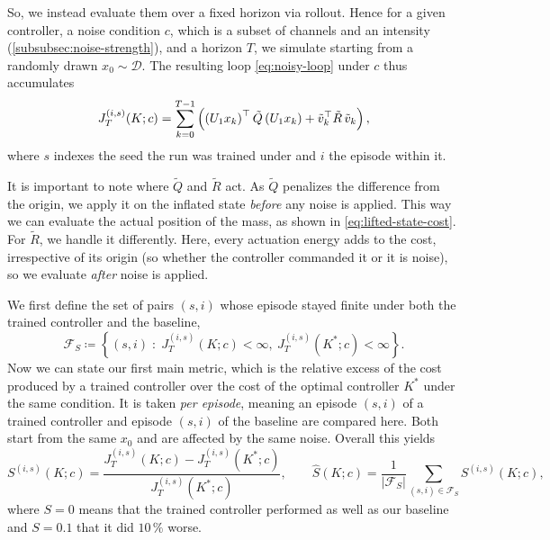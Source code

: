 So, we instead evaluate them over a fixed horizon via rollout. Hence for
a given controller, a noise condition $c$, which is a subset of channels and an
intensity (\cref{subsubsec:noise-strength}), and a horizon $T$, we
simulate starting from a randomly drawn $x_0 \sim \mathcal{D}$.
The resulting loop \eqref{eq:noisy-loop} under $c$ thus accumulates
\begin{equation}
    \label{eq:empirical-return}
    J_T^{(i,s)}(K; c)
    = \sum_{k=0}^{T-1}
      \left( \left( U_1 x_k \right)^{\top} \tilde{Q} \left( U_1 x_k \right) + \tilde{v}_k^{\top} \tilde{R}\, \tilde{v}_k \right) ,
\end{equation}
where $s$ indexes the seed the run was trained under and $i$ the episode
within it.

It is important to note where $\tilde{Q}$ and $\tilde{R}$ act. As $\tilde{Q}$ penalizes the difference
from the origin, we apply it on the inflated state \emph{before} any noise is
applied. This way we can evaluate the actual position of the mass, as shown
in \eqref{eq:lifted-state-cost}. For $\tilde{R}$, we handle it differently. Here,
every actuation energy adds to the cost, irrespective of its origin (so whether the
controller commanded it or it is noise), so we evaluate \emph{after} noise is applied.

We first define the set of pairs $(s,i)$ whose episode stayed finite under both the
trained controller and the baseline,
\begin{equation}
    \label{eq:finite-pairs}
    \mathcal{F}_{S} \coloneqq \left\{ (s,i) \;:\; J^{(i,s)}_T(K; c) < \infty ,\ J^{(i,s)}_T(K^{*}; c) < \infty \right\} .
\end{equation}
Now we can state our first main metric, which
is the relative excess of the cost produced by a
trained controller over the cost of the optimal controller $K^{*}$
under the same condition. It is taken \emph{per episode}, meaning
an episode $(s,i)$ of a trained controller and episode $(s,i)$ of the baseline
are compared here. Both start from the same $x_0$ and are affected by
the same noise. Overall this yields
\begin{equation}
    \label{eq:suboptimality}
    S^{(i,s)}(K; c)
        = \frac{J^{(i,s)}_T(K; c) - J^{(i,s)}_T(K^{*}; c)}
                {J^{(i,s)}_T(K^{*}; c)} ,
    \qquad
    \hat{S}(K; c)
        = \frac{1}{\lvert \mathcal{F}_{S} \rvert}
          \sum_{(s,i) \in \mathcal{F}_{S}} S^{(i,s)}(K; c) ,
\end{equation}
where $S = 0$ means that the trained controller performed as well
as our baseline and $S = 0.1$ that it did $10\,\%$ worse.

